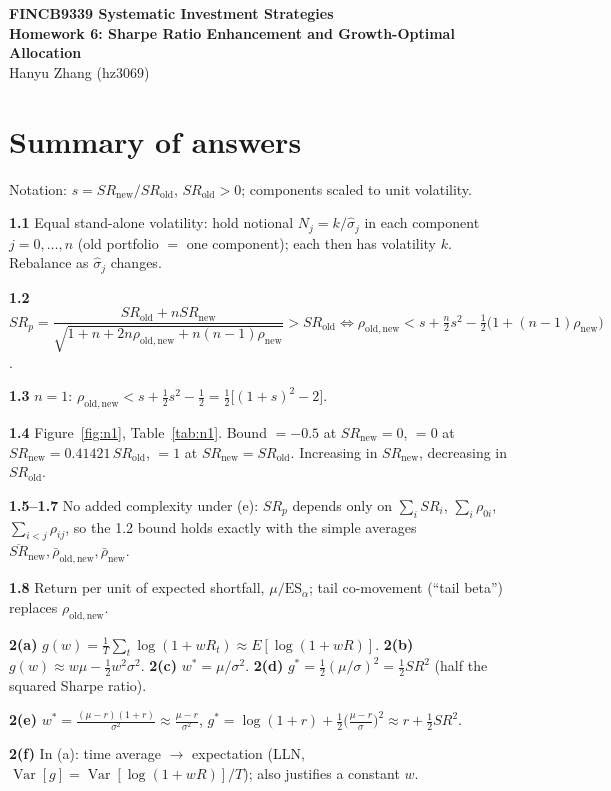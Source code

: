 \documentclass[11pt,letterpaper]{article}
\newcommand{\SRo}{SR_{\mathrm{old}}}
\newcommand{\SRn}{SR_{\mathrm{new}}}
\newcommand{\RhoOn}{\rho_{\mathrm{old,new}}}
\newcommand{\RhoNew}{\rho_{\mathrm{new}}}
\newcommand{\rZeroCross}{0.41421}
\begin{document}
\begin{center}{\Large\bfseries FINCB9339 Systematic Investment Strategies\\[3pt]
Homework 6: Sharpe Ratio Enhancement and Growth-Optimal Allocation}\\[8pt]
Hanyu Zhang (hz3069)\end{center}
\section*{Summary of answers}
Notation: $s=\SRn/\SRo$, $\SRo>0$; components scaled to unit volatility.

\textbf{1.1} Equal stand-alone volatility: hold notional $N_j=k/\hat\sigma_j$ in each component $j=0,\dots,n$ (old portfolio $=$ one component); each then has volatility $k$. Rebalance as $\hat\sigma_j$ changes.

\textbf{1.2} $SR_{p}=\dfrac{\SRo+n\SRn}{\sqrt{1+n+2n\RhoOn+n(n-1)\RhoNew}}>\SRo
\iff \boxed{\RhoOn<s+\tfrac n2 s^2-\tfrac12\big(1+(n-1)\RhoNew\big)}$.

\textbf{1.3} $n=1$: $\RhoOn<s+\tfrac12s^2-\tfrac12=\tfrac12\big[(1+s)^2-2\big]$.

\textbf{1.4} Figure~\ref{fig:n1}, Table~\ref{tab:n1}. Bound $=-0.5$ at $\SRn=0$, $=0$ at $\SRn=\rZeroCross\,\SRo$, $=1$ at $\SRn=\SRo$. Increasing in $\SRn$, decreasing in $\SRo$.

\textbf{1.5--1.7} No added complexity under (e): $SR_p$ depends only on $\sum_iSR_i$, $\sum_i\rho_{0i}$, $\sum_{i<j}\rho_{ij}$, so the 1.2 bound holds exactly with the simple averages $\overline{SR}_{\mathrm{new}},\bar\rho_{\mathrm{old,new}},\bar\rho_{\mathrm{new}}$.

\textbf{1.8} Return per unit of expected shortfall, $\mu/\mathrm{ES}_\alpha$; tail co-movement (``tail beta'') replaces $\RhoOn$.

\textbf{2(a)} $g(w)=\frac1T\sum_t\log(1+wR_t)\approx E[\log(1+wR)]$.\quad
\textbf{2(b)} $g(w)\approx w\mu-\frac12w^2\sigma^2$.\quad
\textbf{2(c)} $w^*=\mu/\sigma^2$.\quad
\textbf{2(d)} $g^*=\frac12(\mu/\sigma)^2=\frac12SR^2$ (half the squared Sharpe ratio).

\textbf{2(e)} $w^*=\frac{(\mu-r)(1+r)}{\sigma^2}\approx\frac{\mu-r}{\sigma^2}$,\; $g^*=\log(1+r)+\frac12\big(\frac{\mu-r}{\sigma}\big)^2\approx r+\frac12SR^2$.

\textbf{2(f)} In (a): time average $\to$ expectation (LLN, $\operatorname{Var}[g]=\operatorname{Var}[\log(1+wR)]/T$); also justifies a constant $w$.
\end{document}
